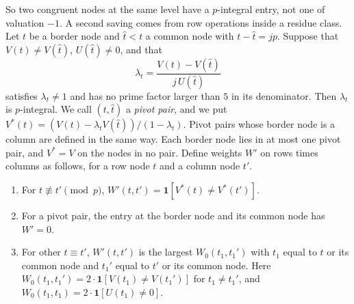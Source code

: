 \documentclass[11pt]{amsart}
\theoremstyle{definition}
\theoremstyle{remark}
\numberwithin{equation}{section}
\begin{document}
So two congruent nodes at the same level have a $p$-integral entry, not one of valuation $-1$. A second saving comes
from row operations inside a residue class. Let $t$ be a border node and $\hat t<t$ a common node with $t-\hat t=jp$.
Suppose that $V(t)\ne V(\hat t)$, $U(\hat t)\ne0$, and that
\[
 \lambda_t=\frac{V(t)-V(\hat t)}{j\,U(\hat t)}
\]
satisfies $\lambda_t\ne1$ and has no prime factor larger than $5$ in its denominator. Then $\lambda_t$ is $p$-integral.
We call $(t,\hat t)$ a \emph{pivot pair}, and we put $V^*(t)=(V(t)-\lambda_tV(\hat t))/(1-\lambda_t)$. Pivot pairs whose
border node is a column are defined in the same way. Each border node lies in at most one pivot pair, and $V^*=V$ on
the nodes in no pair. Define weights $W'$ on rows times columns as follows, for a row node $t$ and a column node $t'$.
\begin{enumerate}[label=(\roman*),leftmargin=*]
\item For $t\not\equiv t'\pmod p$, $W'(t,t')=\mathbf 1[V^*(t)\ne V^*(t')]$.
\item For a pivot pair, the entry at the border node and its common node has $W'=0$.
\item For other $t\equiv t'$, $W'(t,t')$ is the largest $W_0(t_1,t_1')$ with $t_1$ equal to $t$ or its common node and
 $t_1'$ equal to $t'$ or its common node. Here $W_0(t_1,t_1')=2\cdot\mathbf 1[V(t_1)\ne V(t_1')]$ for $t_1\ne t_1'$, and
 $W_0(t_1,t_1)=2\cdot\mathbf 1[U(t_1)\ne0]$.
\end{enumerate}
\end{document}
